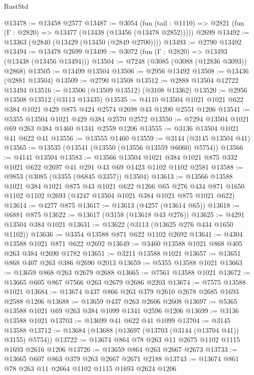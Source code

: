 \begin{lexlean}{RustStd}
\begin{coremodule}
{\begin{coremodule}
{{{{{{{{{{{{{{{{{{{{{{{{{{@13478 := @13458 @2577
@13487 := @3054
    (fun (tail : @1110) => @2821 (fun (Γ : @2820) => @13477 (@13438 (@13456 (@13478 @2852)))))
    @2699
@13492 := @13363 (@2840 (@13429 (@13450 (@2849 @2700))))
@13493 := @2790 @13492
@13494 := @13478 @2699
@13499 := @3072 (fun (Γ : @2820) => @13493 (@13438 (@13456 @13494)))
@13504 := @7248 (@3085 (@3088 (@12836 @3093)) @2868)
@13505 := @13499 @13504
@13506 := @2956 @13492
@13508 := @13436 (@2881 @13504)
@13509 := @2790 @13508
@13512 := @2888 @13504 @12722 @13494
@13516 := @13506 (@13509 @13512) (@3108 @13362)
@13520 := @2956 @13508 @13512 (@3113 @13435)
@13535 := @4110 @13504 @1021 @1021 @622 @384 @1021 @429 @875 @424 @2574 @2698 @43 @1200 @2551 @1206
@13541 := @5355 @13504 @1021 @429 @384 @2570 @2572
@13550 := @7294 @13504 @1021 @69 @263 @384 @1460 @1341 @2559 @1206
@13555 := @3136 @13504 @1021 @41 @622 @41
@13556 := @13555 @1460
@13559 := @3144 (@3145 @13504 @41)
@13565 := @13535 (@13541 (@13550 (@13556 @13559 @6060) @5754))
@13566 := @4141 @13504
@13583 := @13566
    @13504
    @1021
    @384
    @1021
    @875
    @332
    @1021
    @622
    @2697
    @41
    @291
    @43
    @69
    @1423
    @1102
    @1102
    @2581
@13588 := @9853 (@3085 (@3355 (@6845 @3357)) @13504)
@13613 := @13566
    @13588
    @1021
    @384
    @1021
    @875
    @43
    @1021
    @622
    @1266
    @65
    @276
    @434
    @871
    @1650
    @1102
    @1102
    @2693
    (@4247 @13504 @1021 @384 @1021 @875 @1021 @622)
@13614 := @4277 @875
@13617 := @13613 (@4257 (@13614 @65))
@13618 := @6881 @875
@13622 := @13617 (@3158 (@13618 @43 @276))
@13625 := @4291 @13504 @384 @1021
@13631 := @13622 (@3113 (@13625 @276 @434 @1650 @1102))
@13636 := @3354 @13588 @871 @622 @1102 @2692
@13641 := @4304 @13588 @1021 @871 @622 @2692
@13649 := @3460 @13588 @1021 @868 @405 @263 @384 @2690 @1782
@13651 := @3211 @13588 @1021
@13657 := @13651 @868 @407 @263 @386 @2690 @2013
@13659 := @5355 @13588 @1021
@13663 := @13659 @868 @263 @2679 @2688
@13665 := @7561 @13588 @1021
@13672 := @13665 @605 @867 @7566 @263 @2679 @2686 @2203
@13674 := @7575 @13588 @1021
@13684 := @13674 @437 @866 @263 @379 @2610 @2678 @2685 @1693 @2588 @1206
@13688 := @13659 @437 @263 @2606 @2608
@13697 := @5365 @13588 @1021 @69 @263 @384 @1099 @1341 @2596 @1206
@13699 := @3136 @13588 @1021
@13703 := @13699 @41 @622 @41 @1099
@13704 := @3145 @13588
@13712 := @13684 (@13688 (@13697 (@13703 (@3144 (@13704 @41)) @3155) @5754))
@13722 := @13674 @864 @78 @263 @11 @2675 @1102 @1115 @1693 @2616 @1206
@13726 := @13659 @864 @263 @2667 @2673
@13733 := @13665 @607 @863 @379 @263 @2667 @2671 @2188
@13743 := @13674 @861 @78 @263 @11 @2664 @1102 @1115 @1693 @2624 @1206
}}}}}}}}}}}}}}}}}}}}}}}}}}
\end{coremodule}}
\end{coremodule}
\end{lexlean}
